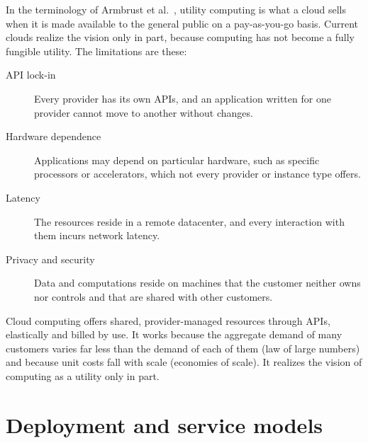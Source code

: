 \documentclass[../main.tex]{subfiles}
\begin{document}
In the terminology of Armbrust et al.\ \cite{armbrust2009}, utility
computing is what a cloud sells when it is made available to the general
public on a pay-as-you-go basis.  Current clouds realize the vision only in
part, because computing has not become a fully fungible utility.  The
limitations are these:
\begin{description}
  \item[API lock-in] Every provider has its own APIs, and an application
    written for one provider cannot move to another without changes.
  \item[Hardware dependence] Applications may depend on particular hardware,
    such as specific processors or accelerators, which not every provider or
    instance type offers.
  \item[Latency] The resources reside in a remote datacenter, and every
    interaction with them incurs network latency.
  \item[Privacy and security] Data and computations reside on machines that
    the customer neither owns nor controls and that are shared with other
    customers.
\end{description}

\begin{keypoint}
  Cloud computing offers shared, provider-managed resources through APIs,
  elastically and billed by use.  It works because the aggregate demand of
  many customers varies far less than the demand of each of them (law of
  large numbers) and because unit costs fall with scale (economies of
  scale).  It realizes the vision of computing as a utility only in part.
\end{keypoint}

\section{Deployment and service models}
\label{sec:l16-models}
\end{document}
